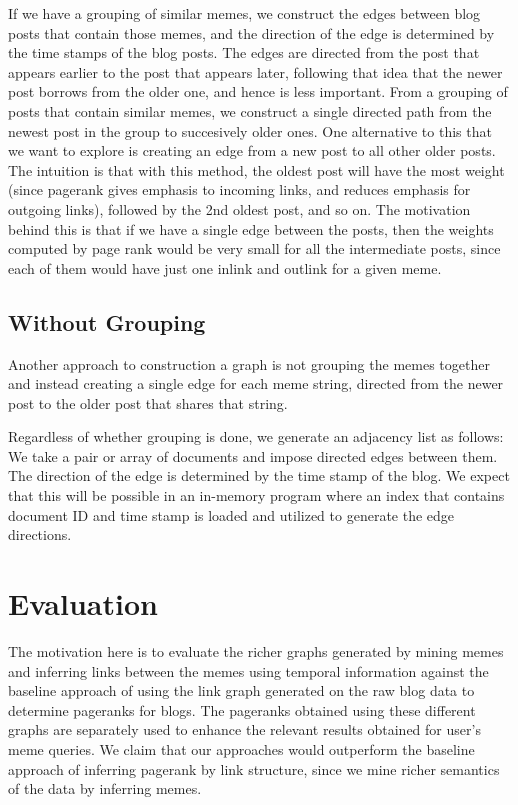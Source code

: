 \documentclass{acm_proc_article-sp}
\begin{document}
If we have a grouping of similar memes, we construct the edges between blog posts that contain those memes, and the direction of the edge is determined by the time stamps of the blog posts. The edges are directed from the post that appears earlier to the post that appears later, following that idea that the newer post borrows from the older one, and hence is less important. From a grouping of posts that contain similar memes, we construct a single directed path from the newest post in the group to succesively older ones. One alternative to this that we want to explore is creating an edge from a new post to all other older posts. The intuition is that with this method, the oldest post will have the most weight (since pagerank gives emphasis to incoming links, and reduces emphasis for outgoing links), followed by the 2nd oldest post, and so on. The motivation behind this is that if we have a single edge between the posts, then the weights computed by page rank would be very small for all the intermediate posts, since each of them would have just one inlink and outlink for a given meme.

\subsection{Without Grouping}
Another approach to construction a graph is not grouping the memes together and instead creating a single edge for each meme string, directed from the newer post to the older post that shares that string.

Regardless of whether grouping is done, we generate an adjacency list as follows: We take a pair or array of documents and impose directed edges between them. The direction of the edge is determined by the time stamp of the blog. We expect that this will be possible in an in-memory program where an index that contains document ID and time stamp is loaded and utilized to generate the edge directions.

\section{Evaluation}
The motivation here is to evaluate the richer graphs generated by mining memes and inferring links between the memes using temporal information against the baseline approach of using the link graph generated on the raw blog data to determine pageranks for blogs. The pageranks obtained using these different graphs are separately used to enhance the relevant results obtained for user's meme queries. We claim that our approaches would outperform the baseline approach of inferring pagerank by link structure, since we mine richer semantics of the data by inferring memes.
\end{document}
